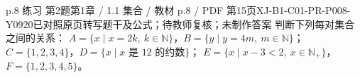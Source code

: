 \par\noindent\begin{minipage}{\linewidth}
\begin{bankitem}{p.8 练习 第2题}{第1章 / 1.1 集合 / 教材 p.8 / PDF 第15页}{XJ-B1-C01-PR-P008-Y0920}{已对照原页转写题干及公式；待教师复核；未制作答案}
判断下列每对集合之间的关系：
$A=\{x\mid x=2k,\ k\in\mathbb N\}$，$B=\{y\mid y=4m,\ m\in\mathbb N\}$；
$C=\{1,2,3,4\}$，$D=\{x\mid x\text{ 是 }12\text{ 的约数}\}$；
$E=\{x\mid x-3<2,\ x\in\mathbb N_+\}$，$F=\{1,2,3,4,5\}$。
\end{bankitem}
\end{minipage}\par\medskip
